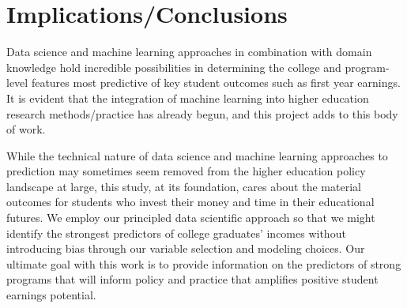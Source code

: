 \documentclass[a4paper, 12pt]{article}
\begin{document}
\section*{Implications/Conclusions}

Data science and machine learning approaches in combination with
domain knowledge hold incredible possibilities in determining the
college and program-level features most predictive of key student
outcomes such as first year earnings. It is evident that the
integration of machine learning into higher education research
methods/practice has already begun, and this project adds to this body
of work.

While the technical nature of data science and machine learning
approaches to prediction may sometimes seem removed from the higher
education policy landscape at large, this study, at its foundation,
cares about the material outcomes for students who invest their money
and time in their educational futures. We employ our principled data
scientific approach so that we might identify the strongest predictors
of college graduates' incomes without introducing bias through our
variable selection and modeling choices. Our ultimate goal with this
work is to provide information on the predictors of strong programs
that will inform policy and practice that amplifies positive student
earnings potential.

\pagebreak
{}
\setlength{} 
\printbibliography
\end{document}
